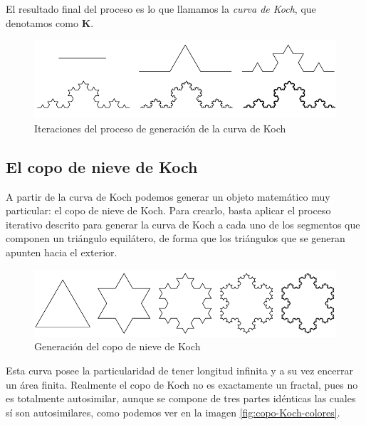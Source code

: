 El resultado final del proceso es lo que llamamos la \textit{curva de Koch}, que denotamos como \textbf{K}.

\begin{figure} [h]
\centering
\includegraphics[scale = 0.5]{img/curva-Koch.png}
\caption{Iteraciones del proceso de generación de la curva de Koch}
 \label{fig:curva-Koch}
\end{figure}

\subsection{El copo de nieve de Koch}
\label{subsection:copo-Koch}

A partir de la curva de Koch podemos generar un objeto matemático muy particular: el copo de nieve de Koch. Para crearlo, basta aplicar el proceso iterativo descrito para generar la curva de Koch a cada uno de los segmentos que componen un triángulo equilátero, de forma que los triángulos que se generan apunten hacia el exterior.


\begin{figure} [h]
\centering
\includegraphics[scale = 0.6]{img/copo-Koch.png}
\caption{Generación del copo de nieve de Koch}
\label{fig:copo-Koch}
\end{figure}

Esta curva posee la particularidad de tener longitud infinita y a su vez encerrar un área finita. Realmente el copo de Koch no es exactamente un fractal, pues no es totalmente autosimilar, aunque se compone de tres partes idénticas las cuales sí son autosimilares, como podemos ver en la imagen \ref{fig:copo-Koch-colores}.

